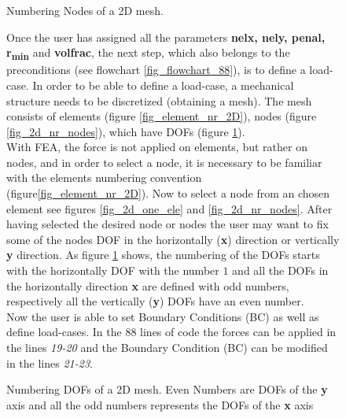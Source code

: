 \begin{figure}[!h]
\begin{minipage}{0.6\textwidth}
   \centering
 
 \caption{Numbering Nodes of a 2D mesh.}    %
 \label{fig_2d_nr_nodes}    
 \vspace{1cm}
 
 \caption{Numbering DOFs of a 2D mesh. Even Numbers are DOFs of the \textbf{y }axis and all the odd numbers represents the DOFs of the \textbf{x} axis}    %
 \label{fig_2d_nr_dofs}      
   \end{minipage}
   \hfill
   \begin{minipage}[h]{0.35\textwidth}
   Once the user has assigned all the parameters \textbf{nelx, nely, penal, r\textsubscript{min}} and \textbf{volfrac}, the next step, which also belongs to the preconditions (see flowchart \ref{fig_flowchart_88}), is to define a load-case. In order to be able to define a load-case, a mechanical structure needs to be discretized (obtaining a mesh).
   The mesh consists of elements (figure \ref{fig_element_nr_2D}), nodes (figure \ref{fig_2d_nr_nodes}), which have DOFs (figure \ref{fig_2d_nr_dofs}). \\
      
 With FEA, the force is not applied on elements, but rather on nodes, and in order to select a node, it is necessary to be familiar with the elements numbering convention (figure\ref{fig_element_nr_2D}). Now to select a node from an
  chosen element see figures \ref{fig_2d_one_ele} and \ref{fig_2d_nr_nodes}. 
  After having selected the desired node or nodes the user may want to fix some
  of the nodes DOF in the horizontally (\textbf{x}) direction or vertically \textbf{y} direction.
  As figure \ref{fig_2d_nr_dofs} shows, the numbering of the DOFs starts with the horizontally DOF with the number \textbf{$1$} and all the DOFs in the horizontally direction \textbf{x} are defined with odd numbers, respectively all the vertically (\textbf{y}) DOFs have an even number.\\
 
 Now the user is able to set Boundary Conditions (BC) as well as define load-cases. In the 88 lines of code the forces can be applied in the lines \textit{19-20} and the  Boundary Condition (BC) can be modified in the lines \textit{21-23}.
   \end{minipage}
\end{figure} 
\newpage



